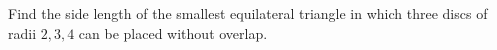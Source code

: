 Find the side length of the smallest equilateral triangle in which three discs of radii $2,3,4$ can be placed without overlap.